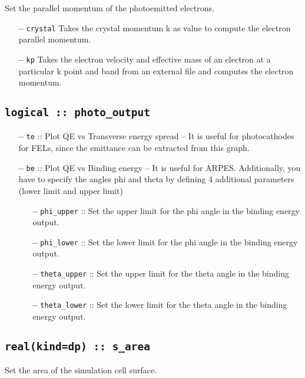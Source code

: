 \documentclass[a4paper,11pt,twoside]{book}
\begin{document}
Set the parallel momentum of the photoemitted electrons.

\begin{itemize}
\item[{\bf --}]  \verb#crystal# Takes the crystal momentum k as value to compute the electron parallel momentum.
\item[{\bf --}]  \verb#kp# Takes the electron velocity and effective mass of an electron at a particular k point and band from an external file and computes the electron momentum.
\end{itemize}

\subsection[photo\_output]{\tt logical :: photo\_output}

\begin{itemize}
\item[{\bf --}]  \verb#te# :: Plot QE vs Transverse energy spread – It is useful for photocathodes for FELs, since the emittance can be extracted from this graph.
\item[{\bf --}]  \verb#be# :: Plot QE vs Binding energy – It is useful for ARPES. Additionally, you have to specify the angles phi and theta by defining 4 additional parameters (lower limit and upper limit)
\begin{itemize}
\item[{\bf --}]  \verb#phi_upper# :: Set the upper limit for the phi angle in the binding energy output.

\item[{\bf --}]  \verb#phi_lower# :: Set the lower limit for the phi angle in the binding energy output.

\item[{\bf --}]  \verb#theta_upper# :: Set the upper limit for the theta angle in the binding energy output.

\item[{\bf --}]  \verb#theta_lower# :: Set the lower limit for the theta angle in the binding energy output.

\end{itemize}
\end{itemize}

\subsection[s\_area]{\tt real(kind=dp) :: s\_area}

Set the area of the simulation cell surface. 
\end{document}
